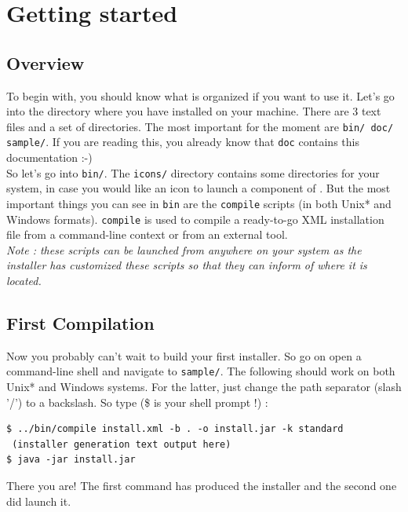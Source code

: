 \chapter{Getting started}

\section{Overview}

To begin with, you should know what \IzPack is organized if you want to use
it. Let's go into the directory where you have installed \IzPack on your
machine. There are 3 text files and a set of directories. The most
important for the moment are \texttt{bin/ doc/ sample/}. If you are reading this,
you already know that \texttt{doc} contains this documentation :-)\\

So let's go into \texttt{bin/}. The \texttt{icons/} directory contains some
directories for your system, in case you would like an icon to launch a
component of \IzPack. But the most important things you can see in \texttt{bin}
are the \texttt{compile} scripts (in both Unix* and Windows formats).
\texttt{compile} is used to compile a ready-to-go XML installation file from
a command-line context or from an external tool.\\

\noindent
\textit{Note : these scripts can be launched from anywhere on your system as the
installer has customized these scripts so that they can inform \IzPack of where
it is located.}\\

\section{First Compilation}

Now you probably can't wait to build your first installer. So go on open a
command-line shell and navigate to \texttt{sample/}. The following should work
on both Unix* and Windows systems. For the latter, just change the path
separator (slash '/') to a backslash. So type (\$ is your shell prompt !) :
\begin{verbatim}
$ ../bin/compile install.xml -b . -o install.jar -k standard
 (installer generation text output here)
$ java -jar install.jar
\end{verbatim}

There you are! The first command has produced the installer and the
second one did launch it.

